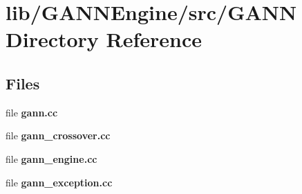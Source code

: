 \section{lib/\+G\+A\+N\+N\+Engine/src/\+G\+A\+N\+N Directory Reference}
\label{dir_e096f33572ec41c9d6f081c77eabfef9}
\subsection*{Files}
\begin{DoxyCompactItemize}
\item 
file {\bfseries gann.\+cc}
\item 
file {\bfseries gann\+\_\+crossover.\+cc}
\item 
file {\bfseries gann\+\_\+engine.\+cc}
\item 
file {\bfseries gann\+\_\+exception.\+cc}
\end{DoxyCompactItemize}
